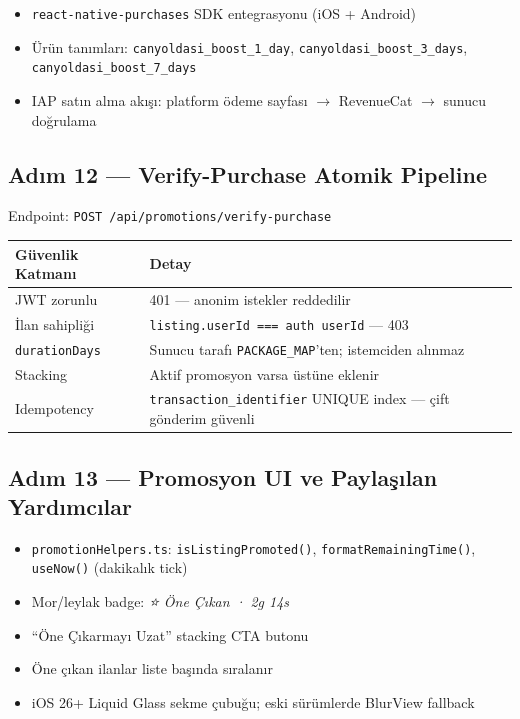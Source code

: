 \documentclass[12pt,a4paper]{article}
\begin{document}
\begin{itemize}[leftmargin=1.5em]
  \item \texttt{react-native-purchases} SDK entegrasyonu (iOS + Android)
  \item Ürün tanımları: \texttt{canyoldasi\_boost\_1\_day}, \texttt{canyoldasi\_boost\_3\_days},
        \texttt{canyoldasi\_boost\_7\_days}
  \item IAP satın alma akışı: platform ödeme sayfası $\rightarrow$ RevenueCat $\rightarrow$ sunucu doğrulama
\end{itemize}

\subsection{Adım 12 — Verify-Purchase Atomik Pipeline}

Endpoint: \texttt{POST /api/promotions/verify-purchase}

\begin{tabularx}{\textwidth}{lX}
  \toprule
  \textbf{Güvenlik Katmanı} & \textbf{Detay} \\
  \midrule
  JWT zorunlu & 401 — anonim istekler reddedilir \\
  İlan sahipliği & \texttt{listing.userId === auth userId} — 403 \\
  \texttt{durationDays} & Sunucu tarafı \texttt{PACKAGE\_MAP}'ten; istemciden alınmaz \\
  Stacking & Aktif promosyon varsa üstüne eklenir \\
  Idempotency & \texttt{transaction\_identifier} UNIQUE index — çift gönderim güvenli \\
  \bottomrule
\end{tabularx}

\subsection{Adım 13 — Promosyon UI ve Paylaşılan Yardımcılar}

\begin{itemize}[leftmargin=1.5em]
  \item \texttt{promotionHelpers.ts}: \texttt{isListingPromoted()}, \texttt{formatRemainingTime()},
        \texttt{useNow()} (dakikalık tick)
  \item Mor/leylak badge: \textit{⭐ Öne Çıkan · 2g 14s}
  \item ``Öne Çıkarmayı Uzat'' stacking CTA butonu
  \item Öne çıkan ilanlar liste başında sıralanır
  \item iOS 26+ Liquid Glass sekme çubuğu; eski sürümlerde BlurView fallback
\end{itemize}
\end{document}
